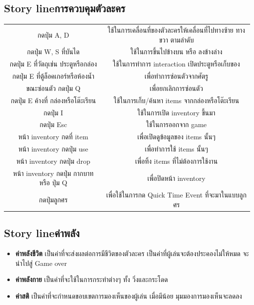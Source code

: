 \subsection{\ifenglish Story line\else การควบคุมตัวละคร\fi }
\begin{center}
    \begin{tabular}{|c|c|}
        \hline
        กดปุ่ม A, D                          & ใช้ในการเคลื่อนที่ของตัวละครให้เคลื่อนที่ไปทางซ้าย ทางขวา ตามลำดับ \\
        กดปุ่ม W, S ที่บันได                    & ใช้ในการขึ้นไปข้างบน หรือ ลงข้างล่าง                        \\
        กดปุ่ม E ที่วัตถุเช่น ประตูหรือกล่อง         & ใช้ในการทำการ interaction เปิดประตูหรือเก็บของ             \\
        กดปุ่ม E ที่ตู้ล็อคเกอร์หรือห้องน้ำ            & เพื่อทำการซ่อนตัวจากศัตรู                                   \\
        ขณะซ่อนตัว กดปุ่ม Q                    & เพื่อยกเลิกการซ่อนตัว                                     \\
        กดปุ่ม E ค้างที่ กล่องหรือโต๊ะเรียน         & ใช้ในการเก็บ/ค้นหา items จากกล่องหรือโต๊ะเรียน              \\
        กดปุ่ม I                             & ใช้ในการเปิด inventory ขึ้นมา                            \\
        กดปุ่ม Esc                           & ใช้ในการออกจาก game                                   \\
        หน้า inventory กดที่ item             & เพื่อเปิดดูข้อมูลของ items นั้นๆ                             \\
        หน้า inventory กดปุ่ม use             & เพื่อทำการใช้ items นั้นๆ                                  \\
        หน้า inventory กดปุ่ม drop            & เพื่อทิ้ง items ที่ไม่ต้องการใช้งาน                           \\
        หน้า inventory กดปุ่ม กากบาท หรือ ปุ่ม Q & เพื่อปิดหน้า inventory                                   \\
        กดปุ่มลูกศร                           & เพื่อใช้ในการกด Quick Time Event ที่จะมาในแบบลูกศร         \\
        \hline
    \end{tabular}
\end{center}
\subsection{\ifenglish Story line\else ค่าพลัง\fi }
\begin{itemize}
    \item \textbf{ค่าพลังชีวิต} เป็นค่าที่จะส่งผลต่อการมีชีวิตของตัวละคร เป็นค่าที่ผู้เล่นจะต้องประคองไม่ให้หมด จะนำไปสู่ Game over
    \item \textbf{ค่าพลังกาย} เป็นค่าที่จะใช้ในการกระทำต่างๆ ทั้ง วิ่งและกระโดด
    \item \textbf{ค่าสติ} เป็นค่าที่จะกำหนดขอบเขตการมองเห็นของผู้เล่น เมื่อมีน้อย มุมมองการมองเห็นจะลดลง
\end{itemize}
